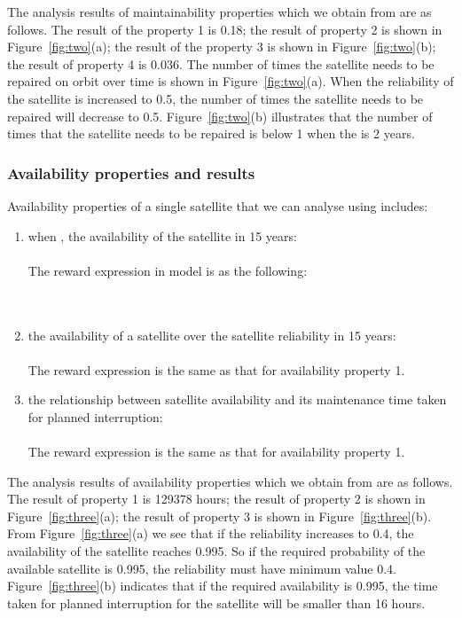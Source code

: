 \documentclass[preprint,12pt]{qrei}
\begin{document}
The analysis results of maintainability properties which we obtain from  are as follows. The result of the property 1 is 0.18; the result of property 2 is shown in Figure~\ref{fig:two}(a); the result of the property 3 is shown in Figure~\ref{fig:two}(b); the result of property 4 is 0.036. The number of times the satellite needs to be repaired on orbit over time is shown in Figure~\ref{fig:two}(a). When the reliability of the satellite is increased to 0.5, the number of times the satellite needs to be repaired will decrease to 0.5. Figure~\ref{fig:two}(b) illustrates that the number of times that the satellite needs to be repaired is below 1 when the  is 2 years. 

\subsubsection{Availability properties and results}

Availability properties of a single satellite that we can analyse using  includes:

\begin{enumerate}
\item when , the availability of the satellite in 15 years:\\
\\
The reward expression in  model is as the following:\\
\\
\\

\item the availability of a satellite over the satellite reliability in 15 years:\\
\\
The reward expression is the same as that for availability property 1.
\item the relationship between satellite availability and its maintenance time taken for planned interruption:\\
\\
The reward expression is the same as that for availability property 1.
\end{enumerate}

The analysis results of availability properties which we obtain from  are as follows. The result of property 1 is 129378 hours; the result of property 2 is shown in Figure~\ref{fig:three}(a); the result of property 3 is shown in Figure~\ref{fig:three}(b). From Figure~\ref{fig:three}(a) we see that if the reliability increases to 0.4, the availability of the satellite reaches 0.995. So if the required probability of the available satellite is 0.995, the reliability must have minimum value 0.4. Figure~\ref{fig:three}(b) indicates that if the required availability is 0.995, the time taken for planned interruption for the satellite will be smaller than 16 hours.
\end{document}
